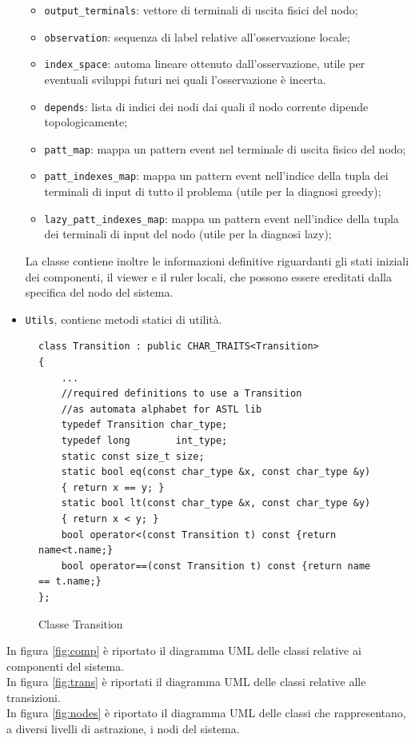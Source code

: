 \begin{itemize}
\begin{itemize}
\item \verb|output_terminals|: vettore di terminali di uscita fisici del nodo;
\item \verb|observation|: sequenza di label relative all'osservazione locale;
\item \verb|index_space|: automa lineare ottenuto dall'osservazione, utile per eventuali sviluppi futuri nei quali l'osservazione è incerta.
\item \verb|depends|: lista di indici dei nodi dai quali il nodo corrente dipende topologicamente;
\item \verb|patt_map|: mappa un pattern event nel terminale di uscita fisico del nodo;
\item \verb|patt_indexes_map|: mappa un pattern event nell'indice della tupla dei terminali di input di tutto il problema (utile per la diagnosi greedy);
\item \verb|lazy_patt_indexes_map|: mappa un pattern event nell'indice della tupla dei terminali di input del nodo (utile per la diagnosi lazy);
\end{itemize}
La classe contiene inoltre le informazioni definitive riguardanti gli stati iniziali dei componenti, il viewer e il ruler locali, che possono essere ereditati dalla specifica del nodo del sistema.
\item \verb|Utils|, contiene metodi statici di utilità.
\end{itemize}


\begin{figure}[htbp]
\begin{verbatim}
class Transition : public CHAR_TRAITS<Transition>
{
    ...
    //required definitions to use a Transition 
    //as automata alphabet for ASTL lib
    typedef Transition char_type;
    typedef long        int_type;
    static const size_t size;
    static bool eq(const char_type &x, const char_type &y) 
    { return x == y; }
    static bool lt(const char_type &x, const char_type &y) 
    { return x < y; }
    bool operator<(const Transition t) const {return name<t.name;}
    bool operator==(const Transition t) const {return name == t.name;}
};
\end{verbatim}
\caption{Classe Transition}
\label{class_trans}
\end{figure}

In figura \ref{fig:comp} è riportato il diagramma UML delle classi relative ai componenti del sistema.\\
In figura \ref{fig:trans} è riportati il diagramma UML delle classi relative alle transizioni.\\
In figura \ref{fig:nodes} è riportato il diagramma UML delle classi che rappresentano, a diversi livelli di astrazione, i nodi del sistema.

